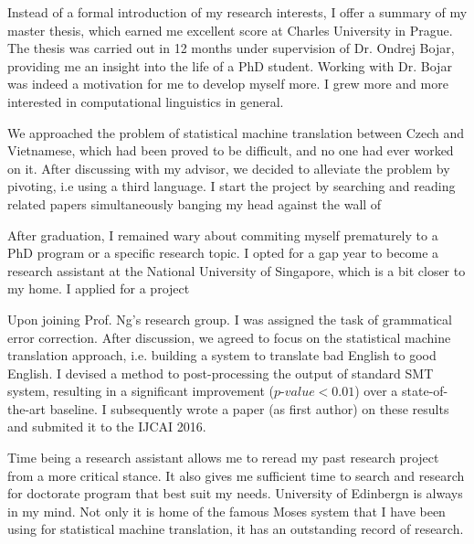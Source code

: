 \documentclass[a4paper, 12pt]{scrartcl}
\begin{document}



Instead of a formal introduction of my research interests, I offer a summary of my master thesis, which earned me excellent score at Charles University in Prague. 
The thesis was carried out in 12 months under supervision of Dr. Ondrej Bojar, providing me an insight into the life of a PhD student.
Working with Dr. Bojar was indeed a motivation for me to develop myself more. I grew more and more interested in computational linguistics in general. 


We approached the problem of statistical machine translation between Czech and Vietnamese, which had been proved to be difficult, and no one had ever worked on it.
After discussing with my advisor, we decided to alleviate the problem by pivoting, i.e using a third language. 
I start the project by searching and reading related papers simultaneously banging my head against the wall of 









After graduation, I remained wary about commiting myself prematurely to a PhD program or a specific research topic. 
I opted for a gap year to become a research assistant at the National University of Singapore, which is a bit closer to my home.
I applied for a project 


Upon joining Prof. Ng's research group. I was assigned the task of grammatical error correction.
After discussion, we agreed to focus on the statistical machine translation approach, i.e. building a system to translate bad English to good English. 
I devised a method to post-processing the output of standard SMT system, resulting in a significant improvement ($p\mbox{-}value < 0.01$) over a state-of-the-art baseline. 
I subsequently wrote a paper (as first author) on these results and submited it to the IJCAI 2016.  

Time being a research assistant allows me to reread my past research project from a more critical stance. It also gives me sufficient time to search and research for doctorate program that best suit my needs.
University of Edinbergn is always in my mind. Not only it is home of the famous Moses system that I have been using for statistical machine translation, it has an outstanding record of research.
\end{document}

